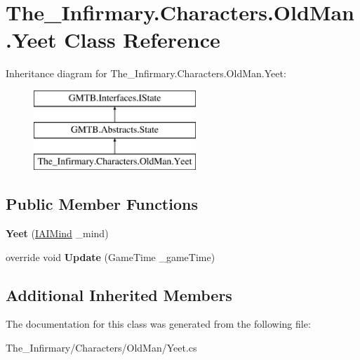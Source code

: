 \hypertarget{class_the___infirmary_1_1_characters_1_1_old_man_1_1_yeet}{}\section{The\+\_\+\+Infirmary.\+Characters.\+Old\+Man.\+Yeet Class Reference}
\label{class_the___infirmary_1_1_characters_1_1_old_man_1_1_yeet}
Inheritance diagram for The\+\_\+\+Infirmary.\+Characters.\+Old\+Man.\+Yeet\+:\begin{figure}[H]
\begin{center}
\leavevmode
\includegraphics[height=3.000000cm]{class_the___infirmary_1_1_characters_1_1_old_man_1_1_yeet}
\end{center}
\end{figure}
\subsection*{Public Member Functions}
\begin{DoxyCompactItemize}
\item 
\mbox{\label{class_the___infirmary_1_1_characters_1_1_old_man_1_1_yeet_a98db14ff249393c668b5a5e1ed91421a}} 
{\bfseries Yeet} (\mbox{\hyperlink{interface_g_m_t_b_1_1_interfaces_1_1_i_a_i_mind}{I\+A\+I\+Mind}} \+\_\+mind)
\item 
\mbox{\label{class_the___infirmary_1_1_characters_1_1_old_man_1_1_yeet_adf2c62333d7754182a9a650b657d654c}} 
override void {\bfseries Update} (Game\+Time \+\_\+game\+Time)
\end{DoxyCompactItemize}
\subsection*{Additional Inherited Members}


The documentation for this class was generated from the following file\+:\begin{DoxyCompactItemize}
\item 
The\+\_\+\+Infirmary/\+Characters/\+Old\+Man/Yeet.\+cs\end{DoxyCompactItemize}

